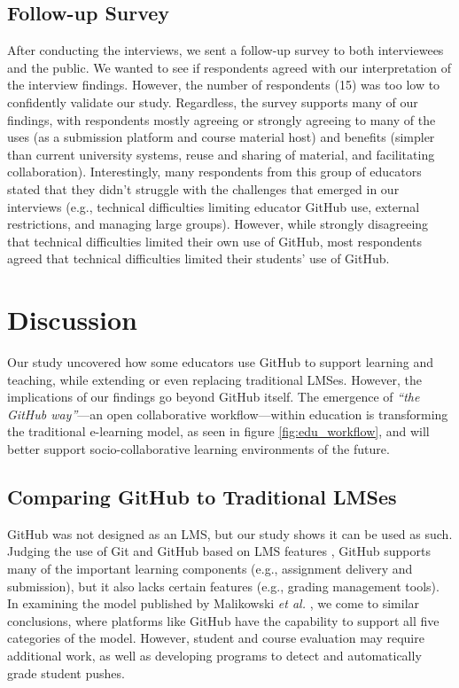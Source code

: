 \subsection{Follow-up Survey}
After conducting the interviews, we sent a follow-up survey to both interviewees and the public. We wanted to see if respondents agreed with our interpretation of the interview findings. However, the number of respondents (15) was too low to confidently validate our study. Regardless, the survey supports many of our findings, with respondents mostly agreeing or strongly agreeing to many of the uses (as a submission platform and course material host) and benefits (simpler than current university systems, reuse and sharing of material, and facilitating collaboration). Interestingly, many respondents from this group of educators stated that they didn't struggle with the challenges that emerged in our interviews (e.g., technical difficulties limiting educator GitHub use, external restrictions, and managing large groups). However, while strongly disagreeing that technical difficulties limited their own use of GitHub, most respondents agreed that technical difficulties limited their students' use of GitHub.

\section{Discussion}
Our study uncovered how some educators use GitHub to support learning and teaching, while extending or even replacing traditional LMSes. However, the implications of our findings go beyond GitHub itself. The emergence of \textit{``the GitHub way''}---an open collaborative workflow---within education is transforming the traditional e-learning model, as seen in figure \ref{fig:edu_workflow}, and will better support socio-collaborative learning environments \cite{kreijns2002sociability} of the future.

\subsection{Comparing GitHub to Traditional LMSes}
GitHub was not designed as an LMS, but our study shows it can be used as such. Judging the use of Git and GitHub based on LMS features \cite{kumar2011comparative}, GitHub supports many of the important learning components (e.g., assignment delivery and submission), but it also lacks certain features (e.g., grading management tools). In examining the model published by Malikowski \textit{et al.} \cite{malikowski2007model}, we come to similar conclusions, where platforms like GitHub have the capability to support all five categories of the model. However, student and course evaluation may require additional work, as well as developing programs to detect and automatically grade student pushes.


